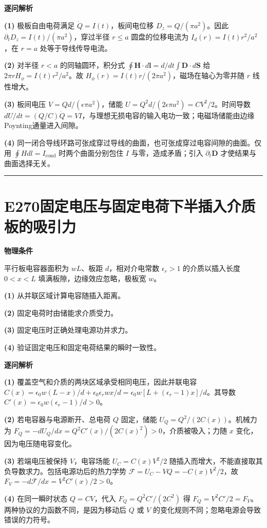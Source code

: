 \documentclass[UTF8,a4paper,11pt,oneside,openany]{ctexbook}
\begin{document}
\par\medskip\noindent\textbf{逐问解析}
\par\noindent\textbf{(1)} 极板自由电荷满足 \(\dot Q=I(t)\)，板间电位移 \(D_z=Q/(\pi a^2)\)。因此 \(\partial_tD_z=I(t)/(\pi a^2)\)，穿过半径 \(r\le a\) 圆盘的位移电流为 \(I_d(r)=I(t)r^2/a^2\)，在 \(r=a\) 处等于导线传导电流。
\par\noindent\textbf{(2)} 对半径 \(r<a\) 的同轴圆环，积分式 \(\oint\boldsymbol H\cdot d\boldsymbol l=d/dt\int\boldsymbol D\cdot d\boldsymbol S\) 给 \(2\pi rH_\phi=I(t)r^2/a^2\)。故 \(H_\phi(r)=I(t)r/(2\pi a^2)\)，磁场在轴心为零并随 \(r\) 线性增大。
\par\noindent\textbf{(3)} 板间电压 \(V=Qd/(\epsilon\pi a^2)\)，储能 \(U=Q^2d/(2\epsilon\pi a^2)=CV^2/2\)。时间导数 \(dU/dt=(Q/C)\dot Q=VI\)，与理想无损电容的输入电功一致；电磁场储能由边缘Poynting通量进入间隙。
\par\noindent\textbf{(4)} 同一闭合导线环路可张成穿过导线的曲面，也可张成穿过电容间隙的曲面。仅用 \(\oint Hdl=I_{\mathrm{cond}}\) 时两个曲面分别包住 \(I\) 与零，造成矛盾；引入 \(\partial_t\boldsymbol D\) 才使结果与曲面选择无关。

\par\bigskip\hrule\bigskip
\section*{E270\quad 固定电压与固定电荷下半插入介质板的吸引力}
\textbf{物理条件}\par 平行板电容器面积为 \(wL\)、板距 \(d\)，相对介电常数 \(\epsilon_r>1\) 的介质以插入长度 \(0<x<L\) 填满板隙，边缘效应忽略，极板宽 \(w\)。
\par\noindent\textbf{(1)} 从并联区域计算电容随插入距离。
\par\noindent\textbf{(2)} 固定电荷时由储能求介质受力。
\par\noindent\textbf{(3)} 固定电压时正确处理电源功并求力。
\par\noindent\textbf{(4)} 验证固定电压和固定电荷结果的瞬时一致性。

\par\medskip\noindent\textbf{逐问解析}
\par\noindent\textbf{(1)} 覆盖空气和介质的两块区域承受相同电压，因此并联电容 \(C(x)=\epsilon_0w(L-x)/d+\epsilon_0\epsilon_rw x/d=\epsilon_0w[L+(\epsilon_r-1)x]/d\)。其导数 \(C'(x)=\epsilon_0w(\epsilon_r-1)/d>0\)。
\par\noindent\textbf{(2)} 若电容器与电源断开、总电荷 \(Q\) 固定，储能 \(U_Q=Q^2/(2C(x))\)。机械力为 \(F_Q=-dU_Q/dx=Q^2C'(x)/(2C(x)^2)>0\)，介质被吸入；力随 \(x\) 变化，因为电压随电容变化。
\par\noindent\textbf{(3)} 若端电压被保持 \(V\)，电容场能 \(U_C=C(x)V^2/2\) 随插入而增大，不能直接取其负导数求力。包括电源功后的热力学势 \(\mathcal F=U_C-VQ=-C(x)V^2/2\)，故 \(F_V=-d\mathcal F/dx=V^2C'(x)/2>0\)。
\par\noindent\textbf{(4)} 在同一瞬时状态 \(Q=CV\)，代入 \(F_Q=Q^2C'/(2C^2)\) 得 \(F_Q=V^2C'/2=F_V\)。两种协议的力函数不同，是因为移动后 \(Q\) 或 \(V\) 的变化规则不同；忽略电源会导致错误的力符号。
\end{document}
